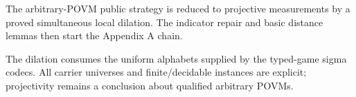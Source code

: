 
The arbitrary-POVM public strategy is reduced to projective measurements by a
proved simultaneous local dilation. The indicator repair and basic distance
lemmas then start the Appendix A chain.

The dilation consumes the uniform alphabets supplied by the typed-game sigma
codecs.  All carrier universes and finite/decidable instances are explicit;
projectivity remains a conclusion about qualified arbitrary POVMs.


